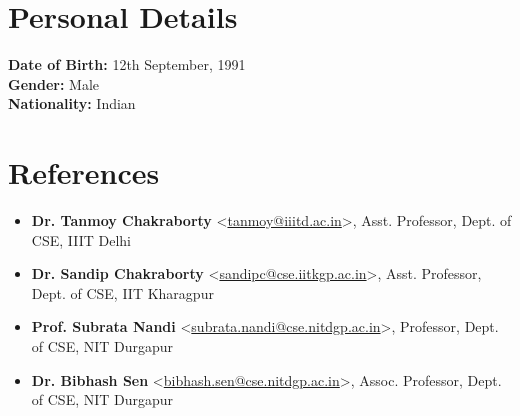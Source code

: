 \documentclass[margin, centered]{res}
\begin{document}
\begin{resume}
\section{Personal Details}
\textbf{Date of Birth:} 12th September, 1991 \\
\textbf{Gender:} Male \\ 
\textbf{Nationality:} Indian

\section{References}
\begin{itemize}[leftmargin=*]
\item[] \textbf{Dr. Tanmoy Chakraborty} \textless \href{mailto:tanmoy@iiitd.ac.in}{tanmoy@iiitd.ac.in}\textgreater, Asst. Professor, Dept. of CSE, IIIT Delhi
\item[] \textbf{Dr. Sandip Chakraborty} \textless \href{mailto:sandipc@cse.iitkgp.ac.in}{sandipc@cse.iitkgp.ac.in}\textgreater, Asst. Professor, Dept. of CSE, IIT Kharagpur
\item[] \textbf{Prof. Subrata Nandi} \textless \href{mailto:subrata.nandi@cse.nitdgp.ac.in}{subrata.nandi@cse.nitdgp.ac.in}\textgreater, Professor, Dept. of CSE, NIT Durgapur
\item[] \textbf{Dr. Bibhash Sen} \textless \href{mailto:bibhash.sen@cse.nitdgp.ac.in}{bibhash.sen@cse.nitdgp.ac.in}\textgreater, Assoc. Professor, Dept. of CSE, NIT Durgapur

\end{itemize}


\end{resume}
\end{document}
